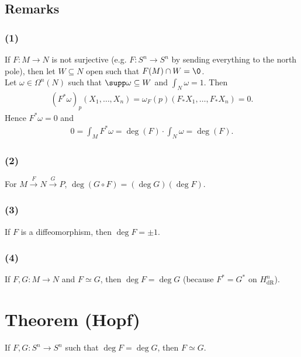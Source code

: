 \documentclass[11pt]{article}
\begin{document}
\subsection*{Remarks}
\label{sec:org0a177e5}
\subsubsection*{(1)}
\label{sec:orgecdb6ad}
If \(F:M\to N\) is not surjective (e.g. \(F:S^{n}\to S^{n}\) by sending everything to the north pole), then let \(W\subseteq N\) open such that \(F(M)\cap W=\0\).\\
Let \(\omega\in\Omega^{n}(N)\) such that \(\supp\omega\subseteq W\) and \(\int_{N}\omega=1\). Then\\
\begin{align*}
  (F^{*}\omega)_{p}(X_{1},\ldots,X_{n})
  =\omega_{F}(p)(F_{*}X_{1},\ldots,F_{*}X_{n})
  =0.
\end{align*}
Hence \(F^{*}\omega=0\) and\\
\begin{align*}
  0=\int_{M}F^{*}\omega=\operatorname{deg}(F)\cdot\int_{N}\omega=\operatorname{deg}(F).
\end{align*}
\subsubsection*{(2)}
\label{sec:org0cd7d7b}
For \(M\overset{F}{\to}N\overset{G}{\to}P\), \(\operatorname{deg}(G\circ F)=(\operatorname{deg}G)(\operatorname{deg}F)\).\\
\subsubsection*{(3)}
\label{sec:orgd7bf13b}
If \(F\) is a diffeomorphism, then \(\operatorname{deg}F=\pm 1\).\\
\subsubsection*{(4)}
\label{sec:org2adecdc}
If \(F,G:M\to N\) and \(F\simeq G\), then \(\operatorname{deg}F=\operatorname{deg}G\) (because \(F^{*}=G^{*}\) on \(H^{n}_{\text{dR}}\)).\\
\section*{Theorem (Hopf)}
\label{sec:orgcedfc1e}
If \(F,G:S^{n}\to S^{n}\) such that \(\operatorname{deg}F=\operatorname{deg}G\), then \(F\simeq G\).\\
\end{document}
